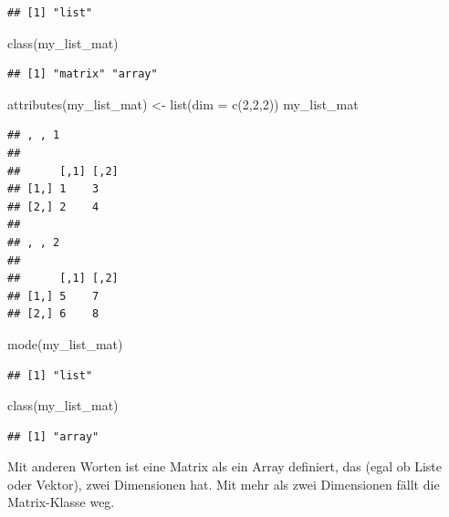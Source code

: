 \documentclass[
]{book}
\newenvironment{Shaded}{\begin{snugshade}}{\end{snugshade}}
\newcommand{\AttributeTok}[1]{\textcolor[rgb]{0.77,0.63,0.00}{#1}}
\newcommand{\DecValTok}[1]{\textcolor[rgb]{0.00,0.00,0.81}{#1}}
\newcommand{\FunctionTok}[1]{\textcolor[rgb]{0.00,0.00,0.00}{#1}}
\newcommand{\NormalTok}[1]{#1}
\newcommand{\OtherTok}[1]{\textcolor[rgb]{0.56,0.35,0.01}{#1}}
\begin{document}
\begin{verbatim}
## [1] "list"
\end{verbatim}

\begin{Shaded}
\begin{Highlighting}[]
\FunctionTok{class}\NormalTok{(my\_list\_mat)}
\end{Highlighting}
\end{Shaded}

\begin{verbatim}
## [1] "matrix" "array"
\end{verbatim}

\begin{Shaded}
\begin{Highlighting}[]
\FunctionTok{attributes}\NormalTok{(my\_list\_mat) }\OtherTok{\textless{}{-}} \FunctionTok{list}\NormalTok{(}\AttributeTok{dim =} \FunctionTok{c}\NormalTok{(}\DecValTok{2}\NormalTok{,}\DecValTok{2}\NormalTok{,}\DecValTok{2}\NormalTok{))}
\NormalTok{my\_list\_mat}
\end{Highlighting}
\end{Shaded}

\begin{verbatim}
## , , 1
## 
##      [,1] [,2]
## [1,] 1    3   
## [2,] 2    4   
## 
## , , 2
## 
##      [,1] [,2]
## [1,] 5    7   
## [2,] 6    8
\end{verbatim}

\begin{Shaded}
\begin{Highlighting}[]
\FunctionTok{mode}\NormalTok{(my\_list\_mat)}
\end{Highlighting}
\end{Shaded}

\begin{verbatim}
## [1] "list"
\end{verbatim}

\begin{Shaded}
\begin{Highlighting}[]
\FunctionTok{class}\NormalTok{(my\_list\_mat)}
\end{Highlighting}
\end{Shaded}

\begin{verbatim}
## [1] "array"
\end{verbatim}

Mit anderen Worten ist eine Matrix als ein Array definiert, das (egal ob Liste oder Vektor), zwei Dimensionen hat. Mit mehr als zwei Dimensionen fällt die Matrix-Klasse weg.
\end{document}
